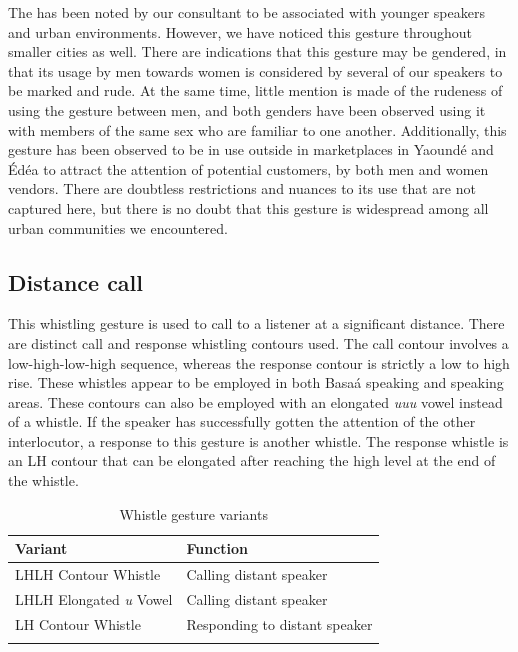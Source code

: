 \documentclass[output=paper
,newtxmath
,modfonts
,nonflat]{langsci/langscibook}
\begin{document}
The  has been noted by our  consultant to be associated with younger speakers and urban environments. However, we have noticed this gesture throughout smaller cities as well. There are indications that this gesture may be gendered, in that its usage by men towards women is considered by several of our speakers to be marked and rude. At the same time, little mention is made of the rudeness of using the gesture between men, and both genders have been observed using it with members of the same sex who are familiar to one another. Additionally, this gesture has been observed to be in use outside in marketplaces in Yaound\'e and \'Ed\'ea to attract the attention of potential customers, by both men and women vendors. There are doubtless restrictions and nuances to its use that are not captured here, but there is no doubt that this gesture is widespread among all urban communities we encountered. 

\subsection{Distance call}
This whistling gesture is used to call to a listener at a significant distance. There are distinct call and response whistling contours used. The call contour involves a low-high-low-high sequence, whereas the response contour is strictly a low to high rise. These whistles appear to be employed in both Basa\'a speaking and  speaking areas. These contours can also be employed with an elongated \textit{uuu} vowel instead of a whistle. If the speaker has successfully gotten the attention of the other interlocutor, a response to this gesture is another whistle. The response whistle is an LH contour that can be elongated after reaching the high level  at the end of the whistle. 

\begin{table}
\caption{Whistle gesture variants}
\begin{tabular}{ll} 
\lsptoprule
Variant & Function \\ \midrule
LHLH Contour Whistle & Calling distant speaker \\ 
LHLH Elongated \textit{u} Vowel & Calling distant speaker \\ 
LH Contour Whistle & Responding to distant speaker \\ \lspbottomrule
\end{tabular}
\end{table}
\end{document}
